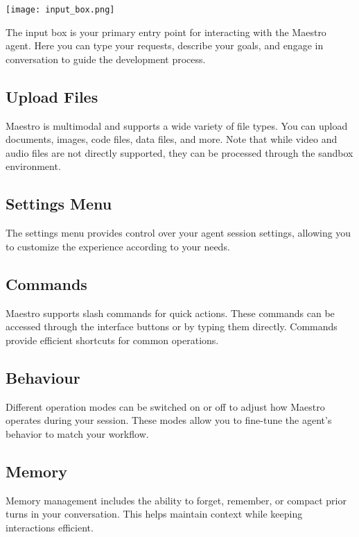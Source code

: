 \documentclass[11pt,letterpaper]{article}
\begin{document}
\begin{center}
\texttt{[image: input\_box.png]}
\end{center}

The input box is your primary entry point for interacting with the Maestro agent. Here you can type your requests, describe your goals, and engage in conversation to guide the development process.

\subsection*{Upload Files}

Maestro is multimodal and supports a wide variety of file types. You can upload documents, images, code files, data files, and more. Note that while video and audio files are not directly supported, they can be processed through the sandbox environment.

\subsection*{Settings Menu}

The settings menu provides control over your agent session settings, allowing you to customize the experience according to your needs.

\subsection*{Commands}

Maestro supports slash commands for quick actions. These commands can be accessed through the interface buttons or by typing them directly. Commands provide efficient shortcuts for common operations.

\subsection*{Behaviour}

Different operation modes can be switched on or off to adjust how Maestro operates during your session. These modes allow you to fine-tune the agent's behavior to match your workflow.

\subsection*{Memory}

Memory management includes the ability to forget, remember, or compact prior turns in your conversation. This helps maintain context while keeping interactions efficient.
\end{document}
